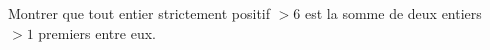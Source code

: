 Montrer que tout entier strictement positif $> 6$ est la somme de deux entiers $> 1$ premiers entre eux.

